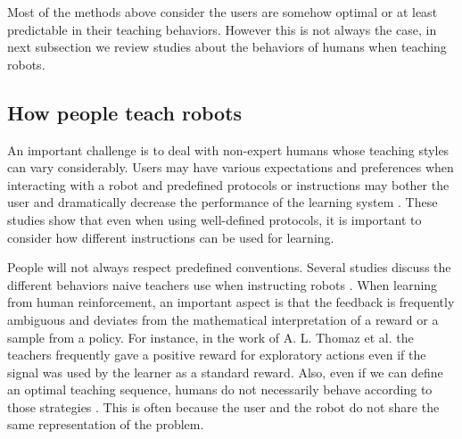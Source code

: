 Most of the methods above consider the users are somehow optimal or at least predictable in their teaching behaviors. However this is not always the case, in next subsection we review studies about the behaviors of humans when teaching robots.

\subsection{How people teach robots}
\label{chapter:related:humanintheloop}

An important challenge is to deal with non-expert humans whose teaching styles can vary considerably. Users may have various expectations and preferences when interacting with a robot and predefined protocols or instructions may bother the user and dramatically decrease the performance of the learning system \cite{thomaz2008teachable,kaochar2011towards,knox2012humans,rouanet2013impact}. These studies show that even when using well-defined protocols, it is important to consider how different instructions can be used for learning.

People will not always respect predefined conventions. Several studies discuss the different behaviors naive teachers use when instructing robots \cite{thomaz2008teachable,Cakmak2010optimality}. When learning from human reinforcement, an important aspect is that the feedback is frequently ambiguous and deviates from the mathematical interpretation of a reward or a sample from a policy. For instance, in the work of A. L. Thomaz et al. \cite{thomaz2008teachable} the teachers frequently gave a positive reward for exploratory actions even if the signal was used by the learner as a standard reward. Also, even if we can define an optimal teaching sequence, humans do not necessarily behave according to those strategies \cite{Cakmak2010optimality}. This is often because the user and the robot do not share the same representation of the problem.

